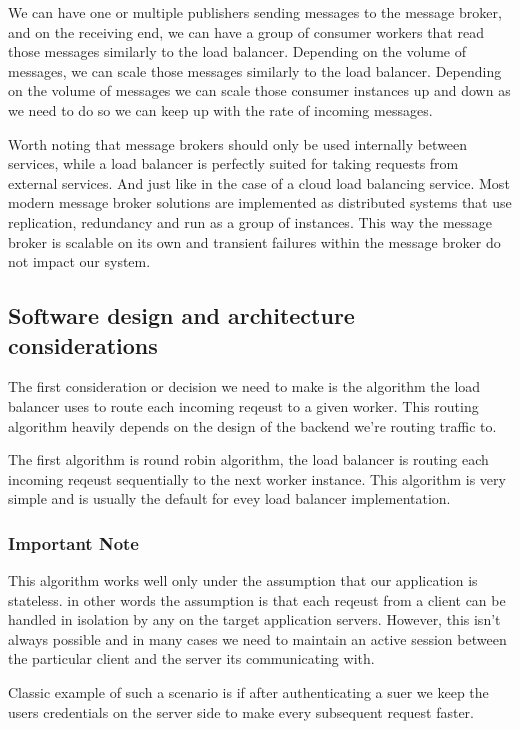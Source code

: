 We can have one or multiple publishers sending messages to the message broker, and on the receiving end, we can have a group of consumer workers that read those messages similarly to the load balancer.
Depending on the volume of messages, we can scale those messages similarly to the load balancer.
Depending on the volume of messages we can scale those consumer instances up and down as we need to do so we can keep up with the rate of incoming messages.

\begin{note}
    Worth noting that message brokers should only be used internally between services, while a load balancer is perfectly suited for taking requests from external services.
    And just like in the case of a cloud load balancing service.
    Most modern message broker solutions are implemented as distributed systems that use replication, redundancy and run as a group of instances.
    This way the message broker is scalable on its own and transient failures within the message broker do not impact our system.
\end{note}

\subsection{Software design and architecture considerations}
The first consideration or decision we need to make is the algorithm the load balancer uses to route each incoming reqeust to a given worker.
This routing algorithm heavily depends on the design of the backend we're routing traffic to.

The first algorithm is round robin algorithm, the load balancer is routing each incoming reqeust sequentially to the next worker instance.
This algorithm is very simple and is usually the default for evey load balancer implementation.

\subsubsection{Important Note} This algorithm works well only under the assumption that our application is stateless.
in other words the assumption is that each reqeust from a client can be handled in isolation by any on the target application servers.
However, this isn't always possible and in many cases we need to maintain an active session between the particular client and the server its communicating with.

Classic example of such a scenario is if after authenticating a suer we keep the users credentials on the server side to make every subsequent request faster.

